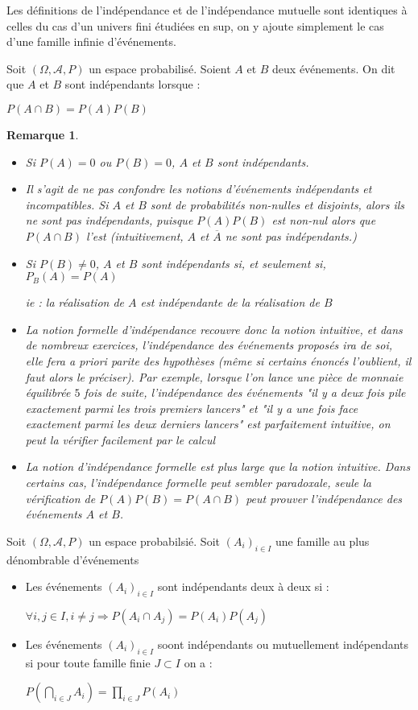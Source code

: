 \documentclass[a4paper,12pt]{book}
\newcommand{\Def}[2]{\begin{tcolorbox}[sharp corners, colback=white,colframe=blue!90!black!75, title=Définition : #1]#2\end{tcolorbox}}
\newtheorem{Rem}{Remarque}[section]
\begin{document}
Les définitions de l'indépendance et de l'indépendance mutuelle sont identiques à celles du cas d'un univers fini étudiées en sup, on y ajoute simplement le cas d'une famille infinie d'événements.
\Def{}{Soit $(\Omega,\mathcal{A},P)$ un espace probabilisé. Soient $A$ et $B$ deux événements. On dit que $A$ et $B$ sont indépendants lorsque :
\par \begin{center}$P(A\cap B)=P(A)P(B)$\end{center}}
\begin{Rem}\begin{itemize}
\item Si $P(A)=0$ ou $P(B)=0$, $A$ et $B$ sont indépendants.
\item Il s'agit de ne pas confondre les notions d'événements indépendants et incompatibles. Si $A$ et $B$ sont de probabilités non-nulles et disjoints, alors ils ne sont pas indépendants, puisque $P(A)P(B)$ est non-nul alors que $P(A\cap B)$ l'est (intuitivement, $A$ et $\overline{A}$ ne sont pas indépendants.)
\item Si $P(B)\neq 0$, $A$ et $B$ sont indépendants si, et seulement si, $P_B(A)=P(A)$ \par ie : la réalisation de $A$ est indépendante de la réalisation de $B$
\item La notion formelle d'indépendance recouvre donc la notion intuitive, et dans de nombreux exercices, l'indépendance des événements proposés ira de soi, elle fera a priori parite des hypothèses (même si certains énoncés l'oublient, il faut alors le préciser). Par exemple, lorsque l'on lance une pièce de monnaie équilibrée $5$ fois de suite, l'indépendance des événements "il y a deux fois pile exactement parmi les trois premiers lancers" et "il y a une fois face exactement parmi les deux derniers lancers" est parfaitement intuitive, on peut la vérifier facilement par le calcul
\item La notion d'indépendance formelle est plus large que la notion intuitive. Dans certains cas, l'indépendance formelle peut sembler paradoxale, seule la vérification de $P(A)P(B)=P(A\cap B)$ peut prouver l'indépendance des événements $A$ et $B$.
\end{itemize}
\end{Rem}
\Def{}{Soit $(\Omega, \mathcal{A}, P)$ un espace probabilsié. Soit $(A_i)_{i\in I}$ une famille au plus dénombrable d'événements\begin{itemize}
\item Les événements $(A_i)_{i\in I}$ sont indépendants deux à deux si :\par\begin{center}$\forall i,j\in I, i\neq j\Rightarrow P(A_i\cap A_j)=P(A_i)P(A_j)$\end{center}
\item Les événements $(A_i)_{i\in I}$ soont indépendants ou mutuellement indépendants si pour toute famille finie $J\subset I$ on a :\par\begin{center}$P\left(\bigcap_{i\in J}A_i\right)=\prod\limits_{i\in J}P(A_i)$\end{center}
\end{itemize}}
\end{document}
